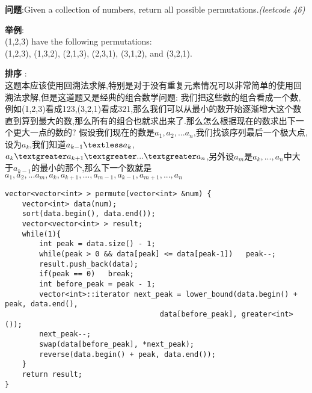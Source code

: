     
\begin{description}
    \item{\textbf{问题}}:Given a collection of numbers, return all possible permutations.\textit{(leetcode 46)}
	\item{\textbf{举例}}:\\
(1,2,3) have the following permutations:\\
(1,2,3), (1,3,2), (2,1,3), (2,3,1), (3,1,2), and (3,2,1).
    \item{\textbf{排序}} : 
    \\这题本应该使用回溯法求解,特别是对于没有重复元素情况可以非常简单的使用回溯法求解,但是这道题又是经典的组合数学问题: 我们把这些数的组合看成一个数,例如(1,2,3)看成123,(3,2,1)看成321,那么我们可以从最小的数开始逐渐增大这个数直到算到最大的数,那么所有的组合也就求出来了.那么怎么根据现在的数求出下一个更大一点的数的? 假设我们现在的数是$a_1,a_2,...a_n$,我们找该序列最后一个极大点,设为$a_k$,我们知道$a_{k-1} \textless a_k$, $a_k \textgreater a_{k+1} \textgreater ... \textgreater a_n$,另外设$a_m$是$a_k, ..., a_n$中大于$a_{k-1}$的最小的那个,那么下一个数就是$a_1, a_2, ... a_m, a_k, a_{k+1}, ... , a_{m-1}, a_{k-1}, a_{m+1}, ... , a_n$
    \begin{lstlisting}
vector<vector<int> > permute(vector<int> &num) {
	vector<int> data(num);
	sort(data.begin(), data.end());
	vector<vector<int> > result;
	while(1){
		int peak = data.size() - 1;
		while(peak > 0 && data[peak] <= data[peak-1])	peak--;
		result.push_back(data);
		if(peak == 0)	break;
		int before_peak = peak - 1;
		vector<int>::iterator next_peak = lower_bound(data.begin() + peak, data.end(), 
									data[before_peak], greater<int>());
		next_peak--;
		swap(data[before_peak], *next_peak);
		reverse(data.begin() + peak, data.end());
	}
	return result;
}
    \end{lstlisting}
\end{description}
